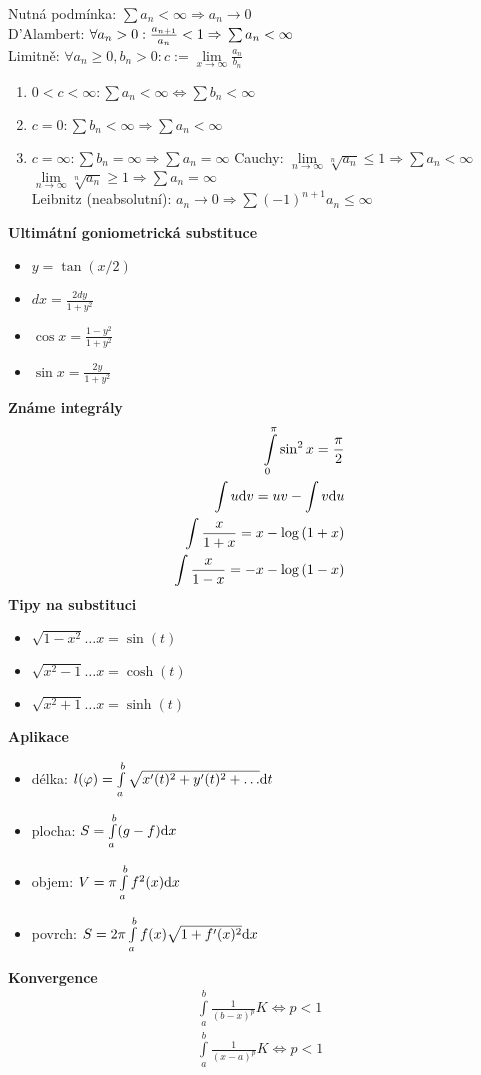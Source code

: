 \documentclass[8pt, a4paper]{extarticle}
\newcommand{\diff}{\textup{d}}
\begin{document}
\begin{multicols}{3}
Nutná podmínka: $\sum a_n < \infty \Rightarrow a_n\rightarrow0$ \\
D'Alambert: $\forall a_n>0: \frac{a_{n+1}}{a_n}<1 \Rightarrow \\ \sum a_n < \infty$ \\
Limitně: $\forall a_n \ge 0, b_n >0: c:=\lim\limits_{x \rightarrow\infty}\frac{a_n}{b_n}$
\begin{enumerate}
\item $0<c<\infty: \sum a_n < \infty \Leftrightarrow \sum b_n < \infty$
\item $c=0: \sum b_n < \infty \Rightarrow \sum a_n < \infty$
\item $c=\infty: \sum b_n = \infty \Rightarrow \sum a_n = \infty$
Cauchy: $\lim\limits_{n \rightarrow\infty}\sqrt[n]{a_n}\le 1 \Rightarrow \sum a_n < \infty$
$\lim\limits_{n \rightarrow\infty}\sqrt[n]{a_n}\ge 1 \Rightarrow \sum a_n = \infty$\\
Leibnitz (neabsolutní): $a_n\rightarrow 0 \Rightarrow \sum (-1)^{n+1}a_n\le \infty$
\end{enumerate}
 
 
\textbf{Ultimátní goniometrická substituce}
\begin{itemize}
\item $ y=\tan\left(x/2\right) $
\item $ dx=\frac{2dy}{1+y^2} $
\item $ \cos x = \frac{1-y^2}{1+y^2} $
\item $ \sin x = \frac{2y}{1+y^2} $
\end{itemize}
\textbf{Známe integrály}
\begin{align*}
\int\limits_{0}^{\pi}\sin^2x=\frac{\pi}{2}\\
\int u\diff v = uv-\int v \diff u\\
\int \frac{x}{1+x} = x - \log{(1+x)}\\
\int \frac{x}{1-x} = -x - \log{(1-x)}
\end{align*}
\textbf{Tipy na substituci}
\begin{itemize}
\item $ \sqrt{1-x^2} \ldots x=\sin(t)$
\item $ \sqrt{x^2-1} \ldots x=\cosh(t)$
\item $ \sqrt{x^2+1} \ldots x=\sinh(t)$
\end{itemize}
\textbf{Aplikace}
\begin{itemize}
\item délka: $l(\varphi)=\int\limits_{a}^{b}\sqrt{x'(t)^2+y'(t)^2+\ldots}\diff t$
\item plocha: $S=\int\limits_{a}^{b}(g-f)\diff x$
\item objem: $V= \pi \int\limits_{a}^{b}f^2(x)\diff x$
\item povrch: $S= 2\pi \int\limits_{a}^{b}f(x)\sqrt{1+f'(x)^2}\diff x$
\end{itemize}
\textbf{Konvergence}
\begin{align*}
\int\limits_{a}^{b}\frac{1}{(b-x)^p} K \Leftrightarrow p < 1 \\
\int\limits_{a}^{b}\frac{1}{(x-a)^p} K \Leftrightarrow p < 1
\end{align*}
 

\end{multicols}
\end{document}
